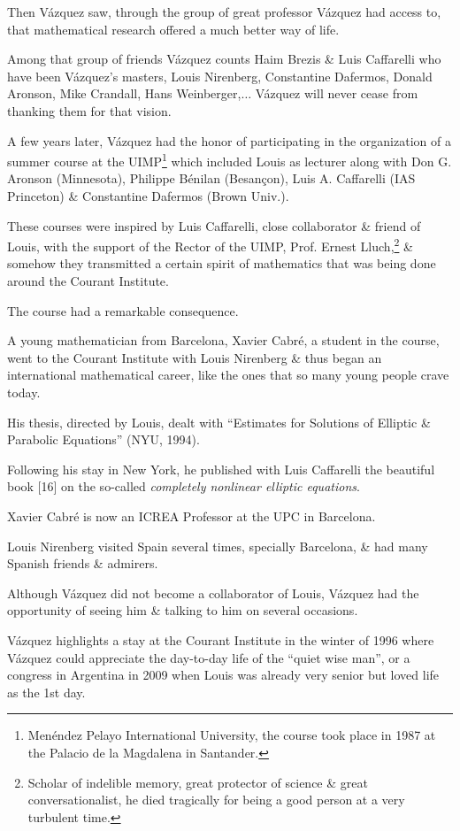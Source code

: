 \documentclass{article}
\begin{document}
Then V\'azquez saw, through the group of great professor V\'azquez had access to, that mathematical research offered a much better way of life.

Among that group of friends V\'azquez counts Haim Brezis \& Luis Caffarelli who have been V\'azquez's masters, Louis Nirenberg, Constantine Dafermos, Donald Aronson, Mike Crandall, Hans Weinberger,$\ldots$ V\'azquez will never cease from thanking them for that vision.

%
A few years later, V\'azquez had the honor of participating in the organization of a summer course at the UIMP\footnote{Men\'endez Pelayo International University, the course took place in 1987 at the Palacio de la Magdalena in Santander.} which included Louis as lecturer along with Don G. Aronson (Minnesota), Philippe Bénilan (Besançon), Luis A. Caffarelli (IAS Princeton) \& Constantine Dafermos (Brown Univ.).

These courses were inspired by Luis Caffarelli, close collaborator \& friend of Louis, with the support of the Rector of the UIMP, Prof. Ernest Lluch,\footnote{Scholar of indelible memory, great protector of science \& great conversationalist, he died tragically for being a good person at a very turbulent time.} \& somehow they transmitted a certain spirit of mathematics that was being done around the Courant Institute.

The course had a remarkable consequence.

A young mathematician from Barcelona, Xavier Cabr\'e, a student in the course, went to the Courant Institute with Louis Nirenberg \& thus began an international mathematical career, like the ones that so many young people crave today.

His thesis, directed by Louis, dealt with ``Estimates for Solutions of Elliptic \& Parabolic Equations'' (NYU, 1994).

Following his stay in New York, he published with Luis Caffarelli the beautiful book [16] on the so-called \textit{completely nonlinear elliptic equations}.

Xavier Cabr\'e is now an ICREA Professor at the UPC in Barcelona.

Louis Nirenberg visited Spain several times, specially Barcelona, \& had many Spanish friends \& admirers.

%
Although V\'azquez did not become a collaborator of Louis, V\'azquez had the opportunity of seeing him \& talking to him on several occasions.

V\'azquez highlights a stay at the Courant Institute in the winter of 1996 where V\'azquez could appreciate the day-to-day life of the ``quiet wise man'', or a congress in Argentina in 2009 when Louis was already very senior but loved life as the 1st day.
\end{document}
